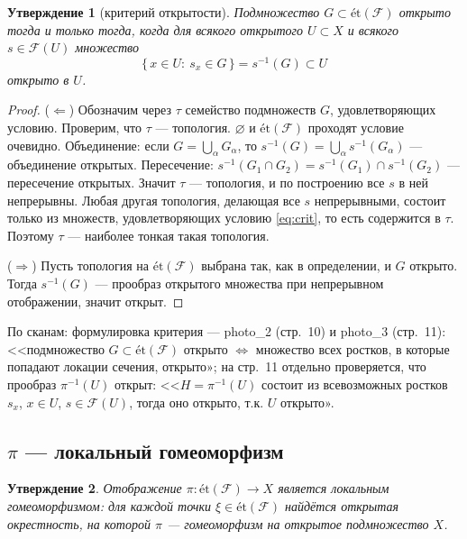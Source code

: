 \documentclass[11pt,b5paper]{article}
\newcommand{\et}{\text{ét}}
\newcommand{\Shv}[1]{\mathscr{#1}}   %
\theoremstyle{plain}
\newtheorem{thminner}{Утверждение}[section]
\theoremstyle{definition}
\theoremstyle{remark}
\newcommand{\thmbeg}{%
  \par\smallskip
  \begin{lrbox}{\thmbox}%
  \begin{minipage}{\linewidth}}
\newcommand{\thmend}{%
  \end{minipage}%
  \end{lrbox}%
  \noindent\usebox{\thmbox}%
  \par\smallskip}
\newenvironment{thm}{\thmbeg\begin{thminner}}{\end{thminner}\thmend}
\newcommand{\sectionsrc}[1]{\par\smallskip\noindent
  {\color{gray}\footnotesize По сканам: #1}\par\medskip}
\let\brutsubsection\subsection
\renewcommand{\subsection}{\Needspace{5\baselineskip}\brutsubsection}
\begin{document}
\begin{thm}[критерий открытости]\label{thm:open}
Подмножество $G\subset\et(\Shv{F})$ открыто тогда и только тогда, когда
для всякого открытого $U\subset X$ и всякого $s\in\Shv{F}(U)$ множество
\begin{equation}\label{eq:crit}
 \{\,x\in U:\ s_x\in G\,\}=s^{-1}(G)\subset U
\end{equation}
открыто в $U$.
\end{thm}

\begin{proof}
($\Leftarrow$) Обозначим через $\tau$ семейство подмножеств $G$,
удовлетворяющих условию. Проверим, что $\tau$ --- топология.
$\varnothing$ и $\et(\Shv{F})$ проходят условие очевидно. Объединение:
если $G=\bigcup_\alpha G_\alpha$, то
$s^{-1}(G)=\bigcup_\alpha s^{-1}(G_\alpha)$ --- объединение открытых.
Пересечение: $s^{-1}(G_1\cap G_2)=s^{-1}(G_1)\cap s^{-1}(G_2)$ ---
пересечение открытых. Значит $\tau$ --- топология, и по построению
все $s$ в ней непрерывны. Любая другая топология, делающая все $s$
непрерывными, состоит только из множеств, удовлетворяющих условию
\eqref{eq:crit}, то есть содержится в $\tau$. Поэтому $\tau$ --- наиболее
тонкая такая топология.

($\Rightarrow$) Пусть топология на $\et(\Shv{F})$ выбрана так, как в
определении, и $G$ открыто. Тогда $s^{-1}(G)$ --- прообраз открытого
множества при непрерывном отображении, значит открыт.
\end{proof}

\sectionsrc{формулировка критерия --- photo\_2 (стр.~10) и
 photo\_3 (стр.~11): <<подмножество $G\subset\et(\Shv{F})$
 открыто $\Leftrightarrow$ множество всех ростков, в которые попадают
 локации сечения, открыто»; на стр.~11 отдельно проверяется, что
 прообраз $\pi^{-1}(U)$ открыт: <<$H=\pi^{-1}(U)$ состоит из
 всевозможных ростков $s_x$, $x\in U$, $s\in\Shv{F}(U)$, тогда оно
 открыто, т.к. $U$ открыто».}

\subsection{\texorpdfstring{$\pi$}{} --- локальный гомеоморфизм}
\leavevmode\par
\begin{thm}\label{thm:localhomeo}
Отображение $\pi\colon\et(\Shv{F})\to X$ является локальным
гомеоморфизмом: для каждой точки $\xi\in\et(\Shv{F})$ найдётся открытая
окрестность, на которой $\pi$ --- гомеоморфизм на открытое подмножество
$X$.
\end{thm}
\end{document}
